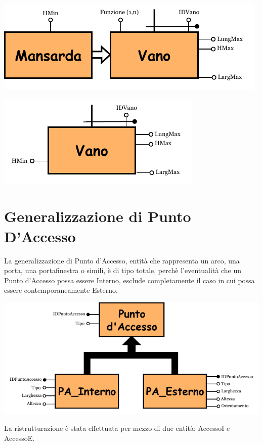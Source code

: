 \documentclass[12pt,a4paper]{report}
\begin{document}
            \vspace*{1.5cm}
            \begin{center}
                \includegraphics[scale=1.7]{genVano.pdf}
            \end{center}
            \vspace*{1.5cm}
            \begin{center}
                \includegraphics[scale=1.7]{genVanoTrad.pdf}
            \end{center}

            \newpage
            
            \section{Generalizzazione di Punto D'Accesso}
                La generalizzazione di Punto d'Accesso, entità che rappresenta un arco, una porta, una portafinestra o simili, è di tipo totale, perchè l'eventualità che un Punto d'Accesso possa essere Interno, esclude completamente il caso in cui possa essere contemporaneamente Esterno.
                \begin{center}
                    \includegraphics[scale=1.1]{genPuntoAccesso.pdf}
                \end{center}
                \vspace*{0.5cm}
                La ristrutturazione è stata effettuata per mezzo di due entità: AccessoI e AccessoE. 
                
\end{document}
